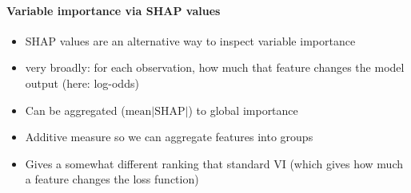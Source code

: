\documentclass[12pt]{article}
\begin{document}
 
\clearpage
\paragraph*{Variable importance via SHAP values}

\begin{itemize}
	\item SHAP values are an alternative way to inspect variable importance
	\item very broadly: for each observation, how much that feature changes the 
	model output (here: log-odds)
	\item Can be aggregated ($\text{mean}|\text{SHAP}|$) to global importance
	\item Additive measure so we can aggregate features into groups
	\item Gives a somewhat different ranking that standard VI (which gives 
	how much a feature changes the loss function)
\end{itemize}
\end{document}

